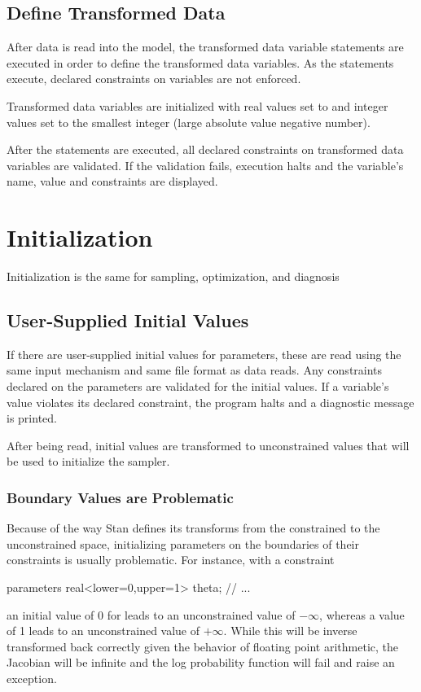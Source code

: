 \subsection{Define Transformed Data}

After data is read into the model, the transformed data variable
statements are executed in order to define the transformed data
variables.  As the statements execute, declared constraints on
variables are not enforced.

Transformed data variables are initialized with real values set to
 and integer values set to the smallest integer (large
absolute value negative number).

After the statements are executed, all declared constraints on
transformed data variables are validated.  If the validation fails,
execution halts and the variable's name, value and constraints are
displayed.

\section{Initialization}

Initialization is the same for sampling, optimization, and diagnosis

\subsection{User-Supplied Initial Values}

If there are user-supplied initial values for parameters, these are
read using the same input mechanism and same file format as data
reads.  Any constraints declared on the parameters are validated for
the initial values.  If a variable's value violates its declared
constraint, the program halts and a diagnostic message is printed.

After being read, initial values are transformed to unconstrained
values that will be used to initialize the sampler.

\subsubsection{Boundary Values are Problematic}

Because of the way Stan defines its transforms from the constrained to
the unconstrained space, initializing parameters on the boundaries of
their constraints is usually problematic.  For instance, with a
constraint
%
\begin{stancode}
parameters {
  real<lower=0,upper=1> theta;
  // ...
}
\end{stancode}
%
an initial value of 0 for  leads to an unconstrained value
of $-\infty$, whereas a value of 1 leads to an unconstrained value of
$+\infty$.  While this will be inverse transformed back correctly
given the behavior of floating point arithmetic, the Jacobian will be
infinite and the log probability function will fail and raise an
exception.

